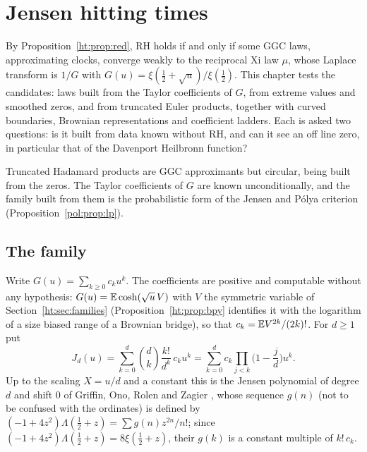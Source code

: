 \section{Jensen hitting times}\label{ht:sec:jensen}

By Proposition~\ref{ht:prop:red}, RH holds if and only if some GGC laws, approximating clocks, converge weakly to the reciprocal Xi law $\mu$, whose Laplace transform is $1/G$ with $G(u)=\xi(\frac12+\sqrt u)/\xi(\frac12)$. This chapter tests the candidates: laws built from the Taylor coefficients of $G$, from extreme values and smoothed zeros, and from truncated Euler products, together with curved boundaries, Brownian representations and coefficient ladders. Each is asked two questions: is it built from data known without RH, and can it see an off line zero, in particular that of the Davenport Heilbronn function?

Truncated Hadamard products are GGC approximants but circular, being built from the zeros. The Taylor coefficients of $G$ are known unconditionally, and the family built from them is the probabilistic form of the Jensen and P\'olya criterion (Proposition~\ref{pol:prop:lp}).

\subsection{The family}
Write $G(u)=\sum_{k\ge0}c_ku^k$. The coefficients are positive and computable without any hypothesis: $G(u)=\mathbb{E}\cosh(\sqrt u\,V)$ with $V$ the symmetric variable of Section~\ref{ht:sec:families} (Proposition~\ref{ht:prop:bpy} identifies it with the logarithm of a size biased range of a Brownian bridge), so that
$c_k=\mathbb{E} V^{2k}/(2k)!$. For $d\ge1$ put
\[
J_d(u)=\sum_{k=0}^d\binom dk\frac{k!}{d^k}\,c_ku^k=\sum_{k=0}^dc_k\prod_{j<k}\Big(1-\frac jd\Big)u^k .
\]
Up to the scaling $X=u/d$ and a constant this is the Jensen polynomial of degree $d$ and shift $0$ of Griffin, Ono, Rolen and Zagier \cite{GORZ19}, whose sequence $g(n)$ (not to be confused with the ordinates) is defined by $(-1+4z^2)\Lambda(\tfrac12+z)=\sum g(n)z^{2n}/n!$; since $(-1+4z^2)\Lambda(\tfrac12+z)=8\xi(\tfrac12+z)$, their $g(k)$ is a constant multiple of $k!\,c_k$.

